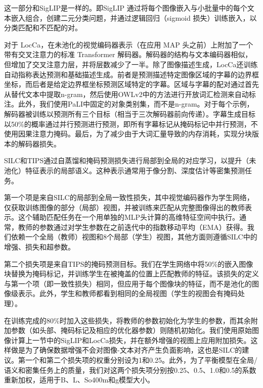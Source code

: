 \documentclass[zihao=false,fontset=windows]{ctexart}
\begin{document}
这一部分和SigLIP是一样的。即SigLIP 通过将每个图像嵌入与小批量中的每个文本嵌入组合，创建二元分类问题，并通过逻辑回归（sigmoid 损失）训练嵌入，以分类匹配和不匹配的对。\par
\par\vspace{0.95em}\par\vspace{0.28em}
对于 LocCa，在未池化的视觉编码器表示（在应用 MAP 头之前）上附加了一个带有交叉注意力的标准 Transformer 解码器。解码器的结构与文本编码器相似，但增加了交叉注意力层，并将层数减少了一半。除了图像描述生成，LocCa还训练自动指称表达预测和基础描述生成。前者是预测描述特定图像区域的字幕的边界框坐标，而后者是给定边界框坐标预测区域特定的字幕。区域与字幕的配对通过首先从替代文本中提取n-gram，然后使用OWLv2中的方法进行开放词汇检测来自动标注。此外，我们使用PaLI中固定的对象类别集，而不是n-gram。对于每个示例，解码器被训练以预测所有三个目标（相当于三次解码器前向传递）。字幕生成目标以50\%的概率通过并行预测进行预测，即所有字幕标记从掩码标记中并行预测，不使用因果注意力掩码。最后，为了减少由于大词汇量导致的内存消耗，实现分块版本的解码器损失。\par
\par\vspace{0.95em}\par\vspace{0.28em}
SILC和TIPS通过自蒸馏和掩码预测损失进行局部到全局的对应学习，以提升（未池化）特征表示的局部语义。这种表示通常用于像分割、深度估计等密集预测任务。\par
第一个项是来自SILC的局部到全局一致性损失，其中视觉编码器作为学生网络，仅获取训练图像的部分（局部）视图，并被训练来匹配从完整图像得出的教师表示。这个辅助匹配任务在一个用单独的MLP头计算的高维特征空间中执行。通常，教师的参数通过对学生参数在之前迭代中的指数移动平均（EMA）获得。我们依赖一个全局（教师）视图和8个局部（学生）视图，其他方面则遵循SILC中的增强、损失和超参数。\par
第二个损失项是来自TIPS的掩码预测目标。我们在学生网络中将50\%的嵌入图像块替换为掩码标记，并训练学生在被掩盖的位置上匹配教师的特征。该损失的定义与第一个项（即一致性损失）相同，但应用于每个图像块的特征，而不是池化的图像级表示。此外，学生和教师都看到相同的全局视图（学生的视图会有掩码处理）。\par
在训练完成的80\%时加入这些损失，将教师的参数初始化为学生的参数，而其余附加参数（如头部、掩码标记及相应的优化器参数）则随机初始化。我们使用原始图像计算上一节中的SigLIP和LocCa损失，并在额外增强的视图上应用附加损失。这样做是为了确保数据增强不会对图像-文本对齐产生负面影响，这也是SILC的建议。第一个和第二个损失项的权重分别设为1和0.25。此外，为了平衡模型在全局/语义和密集任务上的质量，我们对这两个损失项分别按0.25、0.5、1.0和0.5的系数重新加权，适用于B、L、So400m和g模型大小。\par
\end{document}
